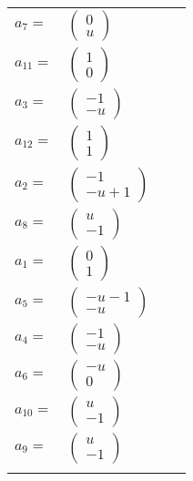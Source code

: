 \documentclass[1p]{elsarticle_modified}
\theoremstyle{definition}
\begin{document}
\begin{tabular}{m{7pt} m{180pt} m{7pt} m{180pt} }
\flushright $a_{7}=$&$\begin{pmatrix}0\\u\end{pmatrix}$ \\
\flushright $a_{11}=$&$\begin{pmatrix}1\\0\end{pmatrix}$ \\
\flushright $a_{3}=$&$\begin{pmatrix}-1\\- u\end{pmatrix}$ \\
\flushright $a_{12}=$&$\begin{pmatrix}1\\1\end{pmatrix}$ \\
\flushright $a_{2}=$&$\begin{pmatrix}-1\\- u+1\end{pmatrix}$ \\
\flushright $a_{8}=$&$\begin{pmatrix}u\\-1\end{pmatrix}$ \\
\flushright $a_{1}=$&$\begin{pmatrix}0\\1\end{pmatrix}$ \\
\flushright $a_{5}=$&$\begin{pmatrix}- u-1\\- u\end{pmatrix}$ \\
\flushright $a_{4}=$&$\begin{pmatrix}-1\\- u\end{pmatrix}$ \\
\flushright $a_{6}=$&$\begin{pmatrix}- u\\0\end{pmatrix}$ \\
\flushright $a_{10}=$&$\begin{pmatrix}u\\-1\end{pmatrix}$ \\
\flushright $a_{9}=$&$\begin{pmatrix}u\\-1\end{pmatrix}$\\&\end{tabular}
\end{document}
